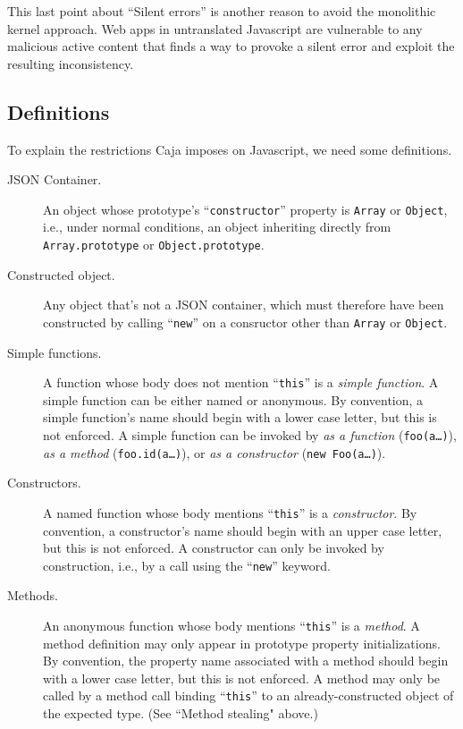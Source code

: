 \documentclass[letterpaper,twocolumn,10pt]{article}
\newcommand{\code}[1]{{\tt {#1}}}              %
\begin{document}
This last point about ``Silent errors'' is another reason to avoid the 
monolithic kernel approach. Web apps in untranslated Javascript are 
vulnerable to any malicious active content that finds a way to provoke a 
silent error and exploit the resulting inconsistency.

\subsection{Definitions}

To explain the restrictions Caja imposes on Javascript, we need some
definitions. 

\begin{description}

  \item[JSON Container.] An object whose prototype's ``\code{constructor}'' 
  property is \code{Array} or \code{Object}, i.e., under normal conditions, 
  an object inheriting directly from \code{Array.prototype} or 
  \code{Object.prototype}.

  \item[Constructed object.] Any object that's not a JSON container, which 
  must therefore have been constructed by calling ``\code{new}'' on a 
  consructor other than \code{Array} or \code{Object}. 

  \item[Simple functions.] A function whose body does not mention 
  ``\code{this}'' is a \emph{simple function}. A simple function can be 
  either named or anonymous. By convention, a simple function's name should 
  begin with a lower case letter, but this is not enforced. A simple function 
  can be invoked by \emph{as a function} (\code{foo(a\ldots)}), \emph{as a 
  method} (\code{foo.id(a\ldots)}), or \emph{as a constructor} (\code{new 
  Foo(a\ldots)}).
    
  \item[Constructors.] A named function whose body mentions ``\code{this}'' 
  is a \emph{constructor}. By convention, a constructor's name should begin 
  with an upper case letter, but this is not enforced. A constructor can only 
  be invoked by construction, i.e., by a call using the ``\code{new}'' 
  keyword.
    
  \item[Methods.] An anonymous function whose body mentions ``\code{this}'' 
  is a \emph{method}. A method definition may only appear in prototype 
  property initializations. By convention, the property name associated with 
  a method should begin with a lower case letter, but this is not enforced. A 
  method may only be called by a method call binding ``\code{this}'' to an 
  already-constructed object of the expected type. (See ``Method stealing" 
  above.)

\end{description}
\end{document}
